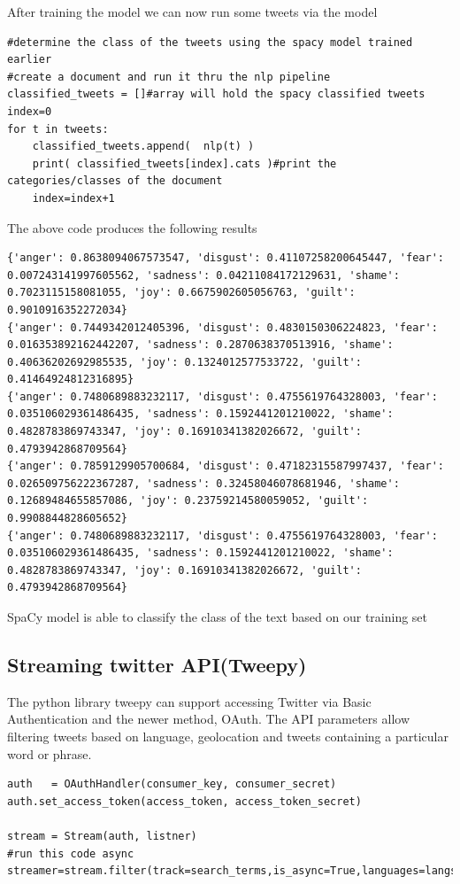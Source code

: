 After training the model we can now run some tweets via the model 
\begin{lstlisting}
#determine the class of the tweets using the spacy model trained earlier
#create a document and run it thru the nlp pipeline 
classified_tweets = []#array will hold the spacy classified tweets
index=0
for t in tweets:
    classified_tweets.append(  nlp(t) )
    print( classified_tweets[index].cats )#print the categories/classes of the document
    index=index+1  
\end{lstlisting}

The above code produces the following results
\begin{lstlisting}
{'anger': 0.8638094067573547, 'disgust': 0.41107258200645447, 'fear': 0.007243141997605562, 'sadness': 0.04211084172129631, 'shame': 0.7023115158081055, 'joy': 0.6675902605056763, 'guilt': 0.9010916352272034}
{'anger': 0.7449342012405396, 'disgust': 0.4830150306224823, 'fear': 0.016353892162442207, 'sadness': 0.2870638370513916, 'shame': 0.40636202692985535, 'joy': 0.1324012577533722, 'guilt': 0.41464924812316895}
{'anger': 0.7480689883232117, 'disgust': 0.4755619764328003, 'fear': 0.035106029361486435, 'sadness': 0.1592441201210022, 'shame': 0.4828783869743347, 'joy': 0.16910341382026672, 'guilt': 0.4793942868709564}
{'anger': 0.7859129905700684, 'disgust': 0.47182315587997437, 'fear': 0.026509756222367287, 'sadness': 0.32458046078681946, 'shame': 0.12689484655857086, 'joy': 0.23759214580059052, 'guilt': 0.9908844828605652}
{'anger': 0.7480689883232117, 'disgust': 0.4755619764328003, 'fear': 0.035106029361486435, 'sadness': 0.1592441201210022, 'shame': 0.4828783869743347, 'joy': 0.16910341382026672, 'guilt': 0.4793942868709564}
\end{lstlisting}

SpaCy model is able to classify the class of the text based on our training set



\clearpage

\subsection{Streaming twitter API(Tweepy)}

The python library tweepy can support accessing Twitter via Basic Authentication and the newer method, OAuth. The API parameters allow filtering tweets based on language, geolocation and tweets containing a particular word or phrase.

\begin{lstlisting}
auth   = OAuthHandler(consumer_key, consumer_secret)
auth.set_access_token(access_token, access_token_secret)

stream = Stream(auth, listner)
#run this code async 
streamer=stream.filter(track=search_terms,is_async=True,languages=langs,locations=loca_tions)
\end{lstlisting}

